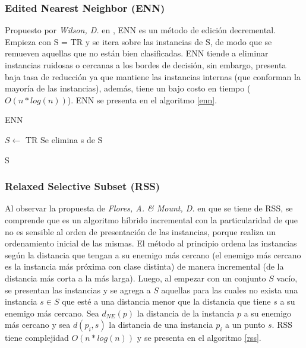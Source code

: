 \subsubsection{Edited Nearest Neighbor (ENN)}

Propuesto por  \emph{Wilson, D.} en \cite{wilson1972asymptotic}, ENN es un método de edición decremental. Empieza con S = TR y se itera sobre las instancias de S, de modo que se remueven aquellas que no están bien clasificadas. ENN tiende a eliminar instancias ruidosas o cercanas a los bordes de decisión, sin embargo, presenta baja tasa de reducción ya que mantiene las instancias internas (que conforman la mayoría de las instancias), además, tiene un bajo costo en tiempo ($O(n*log(n))$). ENN se presenta en el algoritmo \ref{enn}.

\begin{algorithm}
\caption{ENN}
\label{enn}
\begin{algorithmic}[1]


\State $S \gets$ TR
    \State Se elimina s de S
  \EndIf
\EndFor

\State \Return S

\end{algorithmic}
\end{algorithm}

\subsubsection{Relaxed Selective Subset (RSS)}

 Al observar la propuesta de \emph{Flores, A. \& Mount, D.} en \cite{floresnearest} que se tiene de RSS, se comprende que es un algoritmo híbrido incremental con la particularidad de que no es sensible al orden de presentación de las instancias, porque realiza un ordenamiento inicial de las mismas. El método al principio ordena las instancias según la distancia que tengan a su enemigo más cercano (el enemigo más cercano es la instancia más próxima con clase distinta) de manera incremental (de la distancia más corta a la más larga). Luego, al empezar con un conjunto $S$ vacío, se presentan las instancias y se agrega a $S$ aquellas para las cuales no exista una instancia $s \in S$ que esté a una distancia menor que la distancia que tiene $s$ a su enemigo más cercano. Sea $d_{NE}(p)$ la distancia de la instancia $p$ a su enemigo más cercano y sea $d(p_i,s)$ la distancia de una instancia $p_i$ a un punto $s$. RSS tiene complejidad $O(n*log(n))$ y se presenta en el algoritmo \ref{rss}.

